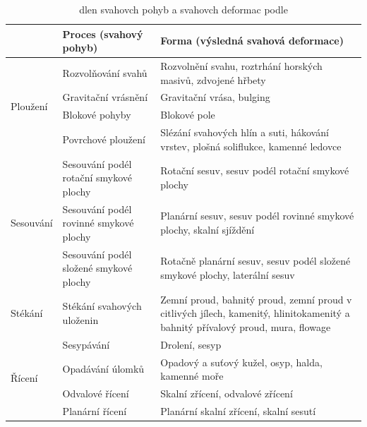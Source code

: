 \begin{table}[t]
	\begin{tabularx}{\textwidth}{lp{4.5cm}X}
		\toprule
		& Proces (svahový pohyb)                 & Forma (výsledná svahová deformace)                                                 \\ \midrule
		\multirow{4}{*}{Ploužení}  & Rozvolňování svahů                     & Rozvolnění svahu, roztrhání horských masivů, zdvojené hřbety                       \\
		& Gravitační vrásnění                    & Gravitační vrása, bulging                                                          \\
		& Blokové pohyby                         & Blokové pole                                                                       \\
		& Povrchové ploužení                     & Slézání svahových hlín a suti, hákování vrstev, plošná soliflukce, kamenné ledovce \\ \midrule
		\multirow{3}{*}{Sesouvání} & Sesouvání podél rotační smykové plochy & Rotační sesuv, sesuv podél rotační smykové plochy                                  \\
		& Sesouvání podél rovinné smykové plochy & Planární sesuv, sesuv podél rovinné smykové plochy, skalní sjíždění                \\
		& Sesouvání podél složené smykové plochy & Rotačně planární sesuv, sesuv podél složené smykové plochy, laterální sesuv        \\ \midrule
		Stékání & Stékání svahových uloženin & Zemní proud, bahnitý proud, zemní proud v citlivých jílech, kamenitý, hlinitokamenitý a bahnitý přívalový proud, mura, flowage \\ \midrule
		\multirow{4}{*}{Řícení}    & Sesypávání                             & Drolení, sesyp                                                                     \\
		& Opadávání úlomků                       & Opadový a suťový kužel, osyp, halda, kamenné moře                                  \\
		
		& Odvalové řícení                        & Skalní zřícení, odvalové zřícení                                                   \\
		& Planární řícení                        & Planární skalní zřícení, skalní sesutí \\                                           \bottomrule
	\end{tabularx}
	\caption{dlen svahovch pohyb a svahovch deformac podle }
	\label{tab:cs_klasifikace}
\end{table}



